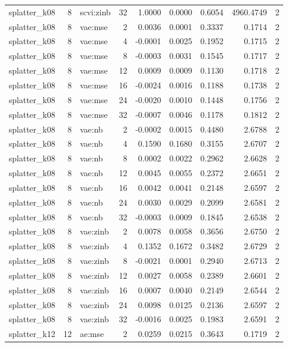 \begin{tabular}{lrlrrrrrr}
splatter\_k08 & 8 & scvi:zinb & 32 & 1.0000 & 0.0000 & 0.6054 & 4960.4749 & 2 \\
splatter\_k08 & 8 & vae:mse & 2 & 0.0036 & 0.0001 & 0.3337 & 0.1714 & 2 \\
splatter\_k08 & 8 & vae:mse & 4 & -0.0001 & 0.0025 & 0.1952 & 0.1715 & 2 \\
splatter\_k08 & 8 & vae:mse & 8 & -0.0003 & 0.0031 & 0.1545 & 0.1717 & 2 \\
splatter\_k08 & 8 & vae:mse & 12 & 0.0009 & 0.0009 & 0.1130 & 0.1718 & 2 \\
splatter\_k08 & 8 & vae:mse & 16 & -0.0024 & 0.0016 & 0.1188 & 0.1738 & 2 \\
splatter\_k08 & 8 & vae:mse & 24 & -0.0020 & 0.0010 & 0.1448 & 0.1756 & 2 \\
splatter\_k08 & 8 & vae:mse & 32 & -0.0007 & 0.0046 & 0.1178 & 0.1812 & 2 \\
splatter\_k08 & 8 & vae:nb & 2 & -0.0002 & 0.0015 & 0.4480 & 2.6788 & 2 \\
splatter\_k08 & 8 & vae:nb & 4 & 0.1590 & 0.1680 & 0.3155 & 2.6707 & 2 \\
splatter\_k08 & 8 & vae:nb & 8 & 0.0002 & 0.0022 & 0.2962 & 2.6628 & 2 \\
splatter\_k08 & 8 & vae:nb & 12 & 0.0045 & 0.0055 & 0.2372 & 2.6651 & 2 \\
splatter\_k08 & 8 & vae:nb & 16 & 0.0042 & 0.0041 & 0.2148 & 2.6597 & 2 \\
splatter\_k08 & 8 & vae:nb & 24 & 0.0030 & 0.0029 & 0.2099 & 2.6581 & 2 \\
splatter\_k08 & 8 & vae:nb & 32 & -0.0003 & 0.0009 & 0.1845 & 2.6538 & 2 \\
splatter\_k08 & 8 & vae:zinb & 2 & 0.0078 & 0.0058 & 0.3656 & 2.6750 & 2 \\
splatter\_k08 & 8 & vae:zinb & 4 & 0.1352 & 0.1672 & 0.3482 & 2.6729 & 2 \\
splatter\_k08 & 8 & vae:zinb & 8 & -0.0021 & 0.0001 & 0.2940 & 2.6713 & 2 \\
splatter\_k08 & 8 & vae:zinb & 12 & 0.0027 & 0.0058 & 0.2389 & 2.6601 & 2 \\
splatter\_k08 & 8 & vae:zinb & 16 & 0.0007 & 0.0040 & 0.2149 & 2.6544 & 2 \\
splatter\_k08 & 8 & vae:zinb & 24 & 0.0098 & 0.0125 & 0.2136 & 2.6597 & 2 \\
splatter\_k08 & 8 & vae:zinb & 32 & -0.0016 & 0.0025 & 0.1983 & 2.6591 & 2 \\
splatter\_k12 & 12 & ae:mse & 2 & 0.0259 & 0.0215 & 0.3643 & 0.1719 & 2 \\

\end{tabular}
